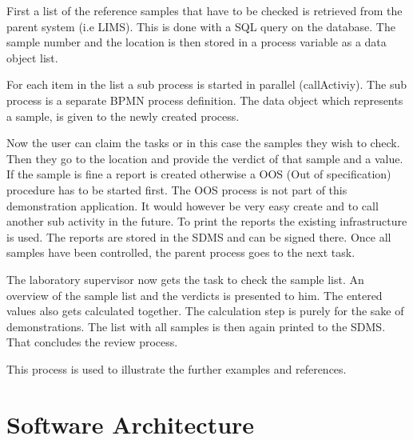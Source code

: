 \documentclass[paper=a4,twoside=false,BCOR=0mm,DIV=calc,fontsize=12pt]{scrartcl}
\begin{document}
First a list of the reference samples that have to be checked is retrieved from the parent system (i.e LIMS). This is done with a SQL query on the database. 
The sample number and the location is then stored in a process variable as a data object list.

For each item in the list a sub process is started in parallel (callActiviy). The sub process is a separate BPMN process definition.
The data object which represents a sample, is given to the newly created process.

Now the user can claim the tasks or in this case the samples they wish to check. Then they go to the location and provide the verdict of that sample and a value. If the sample is fine a report is created otherwise a OOS (Out of specification) procedure has to be started first. The OOS process is not part of this demonstration application. It would however be very easy create and to call another sub activity in the future.
To print the reports the existing infrastructure is used. The reports are stored in the SDMS and can be signed there.
Once all samples have been controlled, the parent process goes to the next task.

The laboratory supervisor now gets the task to check the sample list. An overview of the sample list and the verdicts is presented to him. The entered values also gets calculated together. The calculation step is purely for the sake of demonstrations.
The list with all samples is then again printed to the SDMS. That concludes the review process.

This process is used to illustrate the further examples and references.



\section{Software Architecture}
\end{document}
